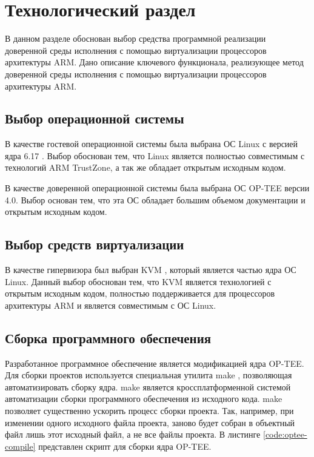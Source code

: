 \section{Технологический раздел}

В данном разделе обоснован выбор средства программной реализации доверенной среды исполнения с помощью виртуализации процессоров архитектуры ARM. Дано описание ключевого функционала, реализующее метод доверенной среды исполнения с помощью виртуализации процессоров архитектуры ARM.

\subsection{Выбор операционной системы}

В качестве гостевой операционной системы была выбрана ОС Linux с версией ядра 6.17 \cite{linux}. Выбор обоснован тем, что Linux является полностью совместимым с технологий ARM TrustZone, а так же обладает открытым исходным кодом.

В качестве доверенной операционной системы была выбрана ОС OP-TEE версии 4.0. Выбор основан тем, что эта ОС обладает большим объемом документации и открытым исходным кодом.

\subsection{Выбор средств виртуализации}

В качестве гипервизора был выбран KVM \cite{kvm}, который является частью ядра ОС Linux. Данный выбор обоснован тем, что KVM является технологией с открытым исходным кодом, полностью поддерживается для процессоров архитектуры ARM и является совместимым с ОС Linux.

\subsection{Сборка программного обеспечения}

Разработанное программное обеспечение является модификацией ядра OP-TEE. Для сборки проектов используется специальная утилита make \cite{make}, позволяющая автоматизировать сборку ядра. make является кроссплатформенной системой автоматизации сборки программного обеспечения из исходного кода. make позволяет существенно ускорить процесс сборки проекта. Так, например, при изменении одного исходного файла проекта, заново будет собран в объектный файл лишь этот исходный файл, а не все файлы проекта. В листинге \ref{code:optee-compile} представлен скрипт для сборки ядра OP-TEE.

